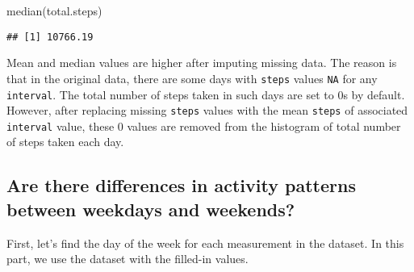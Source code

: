 \documentclass[
]{article}
\newenvironment{Shaded}{\begin{snugshade}}{\end{snugshade}}
\newcommand{\AttributeTok}[1]{\textcolor[rgb]{0.77,0.63,0.00}{#1}}
\newcommand{\ControlFlowTok}[1]{\textcolor[rgb]{0.13,0.29,0.53}{\textbf{#1}}}
\newcommand{\FunctionTok}[1]{\textcolor[rgb]{0.00,0.00,0.00}{#1}}
\newcommand{\NormalTok}[1]{#1}
\newcommand{\OtherTok}[1]{\textcolor[rgb]{0.56,0.35,0.01}{#1}}
\newcommand{\SpecialCharTok}[1]{\textcolor[rgb]{0.00,0.00,0.00}{#1}}
\newcommand{\StringTok}[1]{\textcolor[rgb]{0.31,0.60,0.02}{#1}}
\begin{document}
\begin{Shaded}
\begin{Highlighting}[]
\FunctionTok{median}\NormalTok{(total.steps)}
\end{Highlighting}
\end{Shaded}

\begin{verbatim}
## [1] 10766.19
\end{verbatim}

Mean and median values are higher after imputing missing data. The
reason is that in the original data, there are some days with
\texttt{steps} values \texttt{NA} for any \texttt{interval}. The total
number of steps taken in such days are set to 0s by default. However,
after replacing missing \texttt{steps} values with the mean
\texttt{steps} of associated \texttt{interval} value, these 0 values are
removed from the histogram of total number of steps taken each day.

\hypertarget{are-there-differences-in-activity-patterns-between-weekdays-and-weekends}{%
\subsection{Are there differences in activity patterns between weekdays
and
weekends?}\label{are-there-differences-in-activity-patterns-between-weekdays-and-weekends}}

First, let's find the day of the week for each measurement in the
dataset. In this part, we use the dataset with the filled-in values.

\begin{Shaded}
\end{Shaded}
\end{document}

